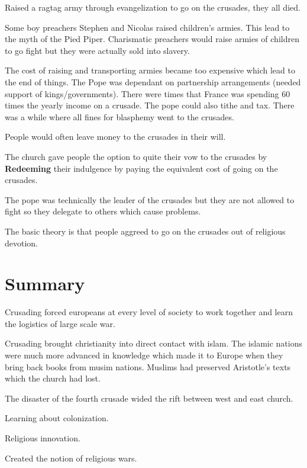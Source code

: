 \documentclass{article}
\begin{document}
Raised a ragtag army through evangelization to go on the crusades, they all died.

Some boy preachers Stephen and Nicolas raised children's armies. This lead to the myth of the Pied Piper. Charismatic preachers would raise armies of children to go fight but they were actually sold into slavery.

The cost of raising and transporting armies became too expensive which lead to the end of things. The Pope was dependant on partnership arrangements (needed support of kings/governments). There were times that France was spending 60 times the yearly income on a crusade. The pope could also tithe and tax. There was a while where all fines for blasphemy went to the crusades.

People would often leave money to the crusades in their will.

The church gave people the option to quite their vow to the crusades by \textbf{Redeeming} their indulgence by paying the equivalent cost of going on the crusades.

The pope was technically the leader of the crusades but they are not allowed to fight so they delegate to others which cause problems.

The basic theory is that people aggreed to go on the crusades out of religious devotion.


\section*{Summary}
\label{sec:summary}
Crusading forced europeans at every level of society to work together and learn the logistics of large scale war.

Crusading brought christianity into direct contact with islam. The islamic nations were much more advanced in knowledge which made it to Europe when they bring back books from musim nations. Muslims had preserved Aristotle's texts which the church had lost.

The disaster of the fourth crusade wided the rift between west and east church.

Learning about colonization.

Religious innovation.

Created the notion of religious wars.
\end{document}
